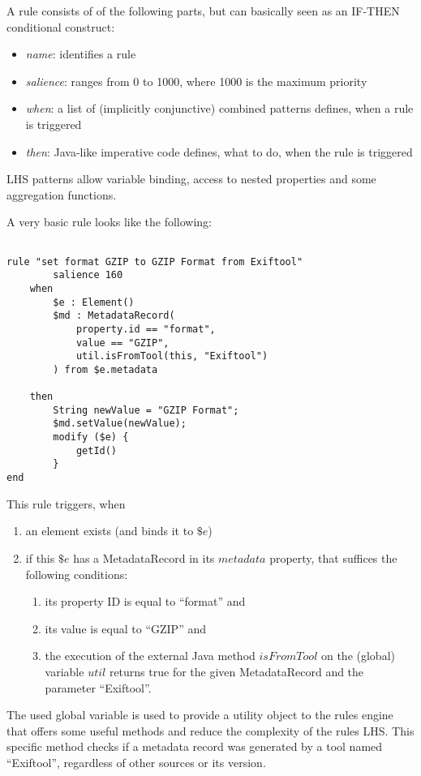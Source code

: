 \documentclass[a4paper,12pt]{article}
\begin{document}
A rule consists of of the following parts, but can basically seen as an IF-THEN conditional construct:
\begin{itemize}
\item \emph{name}: identifies a rule
\item \emph{salience}: ranges from 0 to 1000, where 1000 is the maximum priority
\item \emph{when}: a list of (implicitly conjunctive) combined patterns defines, when a rule is triggered
\item \emph{then}: Java-like imperative code defines, what to do, when the rule is triggered
\end{itemize}

LHS patterns allow variable binding, access to nested properties and some aggregation functions.

A very basic rule looks like the following:
\begin{lstlisting}

rule "set format GZIP to GZIP Format from Exiftool"
        salience 160
    when 
        $e : Element()
        $md : MetadataRecord(
            property.id == "format", 
            value == "GZIP",
            util.isFromTool(this, "Exiftool")
        ) from $e.metadata

    then
        String newValue = "GZIP Format";
        $md.setValue(newValue);
        modify ($e) {
            getId()
        }
end
\end{lstlisting}

This rule triggers, when
\begin{enumerate}
 \item an element exists (and binds it to $\$e$)
 \item if this $\$e$ has a MetadataRecord in its $metadata$ property, that suffices the following conditions:
    \begin{enumerate}
      \item its property ID is equal to ``format'' and
      \item its value is equal to ``GZIP'' and
      \item the execution of the external Java method $isFromTool$ on the (global) variable $util$ returns true for the given MetadataRecord and the parameter ``Exiftool''.
    \end{enumerate}
\end{enumerate}

The used global variable is used to provide a utility object to the rules engine that offers some useful methods and reduce the complexity of the rules LHS. This specific method checks if a metadata record was generated by a tool named ``Exiftool'', regardless of other sources or its version.
\end{document}
